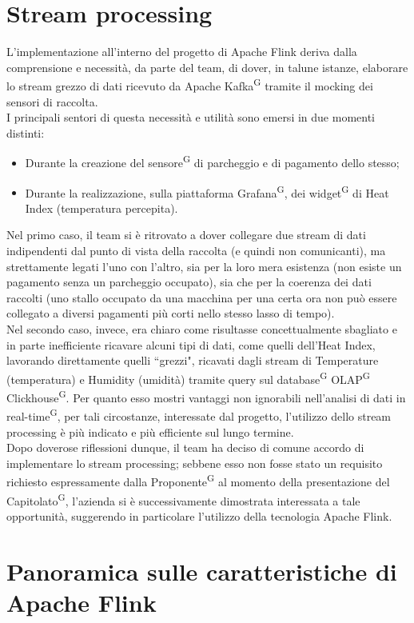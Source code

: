 \documentclass[8pt]{article}
\newcommand{\glossterm}[1]{#1\textsuperscript{G}} %
\begin{document}
\section{Stream processing}
L'implementazione all'interno del progetto di Apache Flink deriva dalla comprensione e necessità, da parte del team, di dover, in talune istanze,
elaborare lo stream grezzo di dati ricevuto da Apache \glossterm{Kafka} tramite il mocking dei sensori di raccolta.\\
I principali sentori di questa necessità e utilità sono emersi in due momenti distinti:
\begin{itemize}
\setlength\itemsep{0em}
    \item Durante la creazione del \glossterm{sensore} di parcheggio e di pagamento dello stesso;
    \item Durante la realizzazione, sulla piattaforma \glossterm{Grafana}, dei \glossterm{widget} di Heat Index (temperatura percepita).
\end{itemize}
Nel primo caso, il team si è ritrovato a dover collegare due stream di dati indipendenti dal punto di vista della raccolta (e quindi non comunicanti),
ma strettamente legati l'uno con l'altro, sia per la loro mera esistenza (non esiste un pagamento senza un parcheggio occupato), sia che per la coerenza
dei dati raccolti (uno stallo occupato da una macchina per una certa ora non può essere collegato a diversi pagamenti più corti nello stesso lasso di tempo).\\
Nel secondo caso, invece, era chiaro come risultasse concettualmente sbagliato e in parte inefficiente ricavare alcuni tipi di dati, 
come quelli dell'Heat Index, lavorando direttamente quelli ``grezzi", ricavati dagli stream di Temperature (temperatura) e Humidity (umidità) tramite query sul 
\glossterm{database} \glossterm{OLAP} \glossterm{Clickhouse}. Per quanto esso mostri vantaggi non ignorabili nell'analisi di dati in \glossterm{real-time}, per tali circostanze, interessate dal 
progetto, l'utilizzo dello stream processing è più indicato e più efficiente sul lungo termine.\\
Dopo doverose riflessioni dunque, il team ha deciso di comune accordo di implementare lo stream processing; sebbene esso non fosse stato un requisito
richiesto espressamente dalla \glossterm{Proponente} al momento della presentazione del \glossterm{Capitolato}, l'azienda si è successivamente dimostrata interessata a tale opportunità, suggerendo in particolare l'utilizzo della tecnologia Apache Flink. 
\section{Panoramica sulle caratteristiche di Apache Flink}
\end{document}
